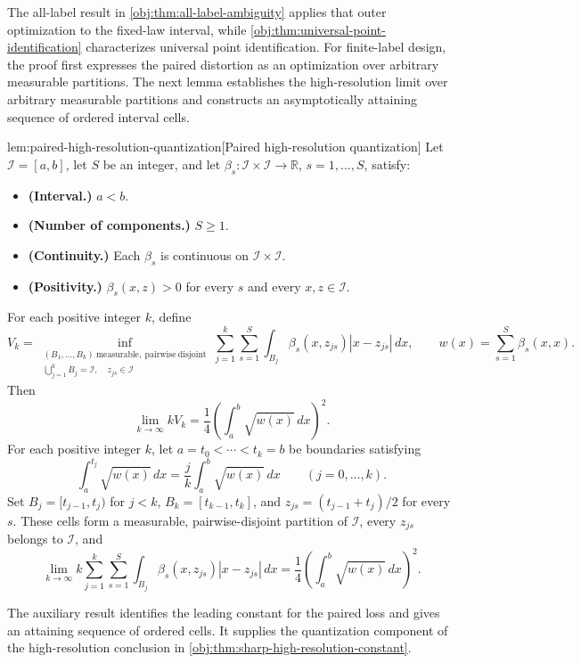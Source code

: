 The all-label result in \cref{obj:thm:all-label-ambiguity} applies that outer optimization to the fixed-law interval, while \cref{obj:thm:universal-point-identification} characterizes universal point identification. For finite-label design, the proof first expresses the paired distortion as an optimization over arbitrary measurable partitions. The next lemma establishes the high-resolution limit over arbitrary measurable partitions and constructs an asymptotically attaining sequence of ordered interval cells.



\begin{lemmav}{lem:paired-high-resolution-quantization}[Paired high-resolution quantization]
Let \(\mathcal I=[a,b]\), let \(S\) be an integer, and let \(\beta_s:\mathcal I\times\mathcal I\to\mathbb R\), \(s=1,\ldots,S\), satisfy:
\begin{itemize}
\item \textbf{(Interval.)} \(a<b\).
\item \textbf{(Number of components.)} \(S\geq1\).
\item \textbf{(Continuity.)} Each \(\beta_s\) is continuous on \(\mathcal I\times\mathcal I\).
\item \textbf{(Positivity.)} \(\beta_s(x,z)>0\) for every \(s\) and every \(x,z\in\mathcal I\).
\end{itemize}
For each positive integer \(k\), define
\[
V_k=
\inf_{\substack{(B_1,\ldots,B_k)\ \mathrm{measurable,\ pairwise\ disjoint}\\
\bigcup_{j=1}^{k}B_j=\mathcal I,\quad z_{js}\in\mathcal I}}
\sum_{j=1}^{k}\sum_{s=1}^{S}
\int_{B_j}\beta_s(x,z_{js})|x-z_{js}|\,dx,
\qquad
w(x)=\sum_{s=1}^{S}\beta_s(x,x).
\]
Then
\[
\lim_{k\to\infty}kV_k
=\frac14\left(\int_a^b\sqrt{w(x)}\,dx\right)^2.
\]
For each positive integer \(k\), let \(a=t_0<\cdots<t_k=b\) be boundaries satisfying
\[
\int_a^{t_j}\sqrt{w(x)}\,dx
=\frac{j}{k}\int_a^b\sqrt{w(x)}\,dx
\qquad (j=0,\ldots,k).
\]
Set \(B_j=[t_{j-1},t_j)\) for \(j<k\), \(B_k=[t_{k-1},t_k]\), and \(z_{js}=(t_{j-1}+t_j)/2\) for every \(s\). These cells form a measurable, pairwise-disjoint partition of \(\mathcal I\), every \(z_{js}\) belongs to \(\mathcal I\), and
\[
\lim_{k\to\infty}
k\sum_{j=1}^{k}\sum_{s=1}^{S}
\int_{B_j}\beta_s(x,z_{js})|x-z_{js}|\,dx
=\frac14\left(\int_a^b\sqrt{w(x)}\,dx\right)^2.
\]
\end{lemmav}

The auxiliary result identifies the leading constant for the paired loss and gives an attaining sequence of ordered cells. It supplies the quantization component of the high-resolution conclusion in \cref{obj:thm:sharp-high-resolution-constant}.

